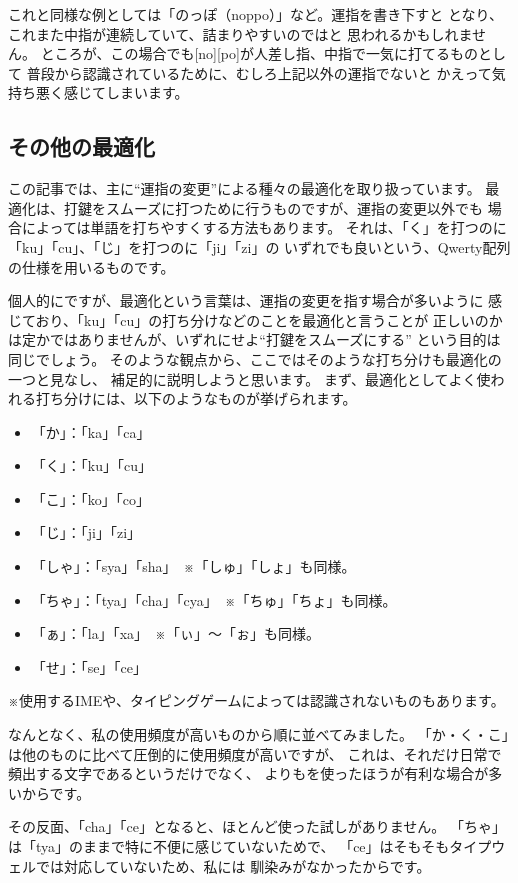 これと同様な例としては「のっぽ（noppo）」など。運指を書き下すと
となり、これまた中指が連続していて、詰まりやすいのではと
思われるかもしれません。
ところが、この場合でも[no][po]が人差し指、中指で一気に打てるものとして
普段から認識されているために、むしろ上記以外の運指でないと
かえって気持ち悪く感じてしまいます。



\subsection{その他の最適化}

この記事では、主に“運指の変更”による種々の最適化を取り扱っています。
最適化は、打鍵をスムーズに打つために行うものですが、運指の変更以外でも
場合によっては単語を打ちやすくする方法もあります。
それは、「く」を打つのに「ku」「cu」、「じ」を打つのに「ji」「zi」の
いずれでも良いという、Qwerty配列の仕様を用いるものです。

個人的にですが、最適化という言葉は、運指の変更を指す場合が多いように
感じており、「ku」「cu」の打ち分けなどのことを最適化と言うことが
正しいのかは定かではありませんが、いずれにせよ“打鍵をスムーズにする”
という目的は同じでしょう。
そのような観点から、ここではそのような打ち分けも最適化の一つと見なし、
補足的に説明しようと思います。
まず、最適化としてよく使われる打ち分けには、以下のようなものが挙げられます。
\begin{itemize}
 \item 「か」：「ka」「ca」
 \item 「く」：「ku」「cu」
 \item 「こ」：「ko」「co」
 \item 「じ」：「ji」「zi」
 \item 「しゃ」：「sya」「sha」　※「しゅ」「しょ」も同様。
 \item 「ちゃ」：「tya」「cha」「cya」　※「ちゅ」「ちょ」も同様。
 \item 「ぁ」：「la」「xa」　※「ぃ」～「ぉ」も同様。
 \item 「せ」：「se」「ce」
\end{itemize}
※使用するIMEや、タイピングゲームによっては認識されないものもあります。

なんとなく、私の使用頻度が高いものから順に並べてみました。
「か・く・こ」は他のものに比べて圧倒的に使用頻度が高いですが、
これは、それだけ日常で頻出する文字であるというだけでなく、
よりもを使ったほうが有利な場合が多いからです。

その反面、「cha」「ce」となると、ほとんど使った試しがありません。
「ちゃ」は「tya」のままで特に不便に感じていないためで、
「ce」はそもそもタイプウェルでは対応していないため、私には
馴染みがなかったからです。

